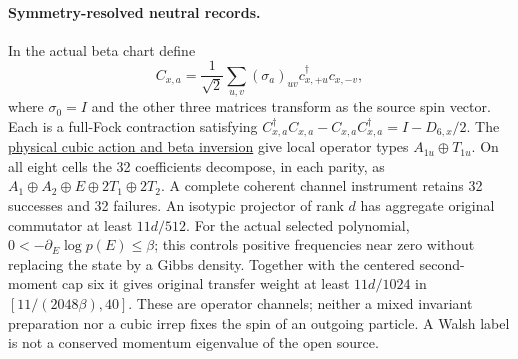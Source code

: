 \paragraph{Symmetry-resolved neutral records.}
In the actual beta chart define
\[
 C_{x,a}=\frac1{\sqrt2}\sum_{u,v}(\sigma_a)_{uv}
                         c^\dagger_{x,+u}c_{x,-v},
\]
where $\sigma_0=I$ and the other three matrices transform as the source
spin vector. Each is a full-Fock contraction satisfying
$C_{x,a}^\dagger C_{x,a}-C_{x,a}C_{x,a}^\dagger=I-D_{6,x}/2$.
The \href{https://github.com/FloatingPragma/observer-patch-holography/blob/main/model/particle_primary_pair_channels/PROOF.md}{physical cubic action and beta inversion}
give local operator types $A_{1u}\oplus T_{1u}$. On all eight cells the
32 coefficients decompose, in each parity, as
$A_1\oplus A_2\oplus E\oplus2T_1\oplus2T_2$.
A complete coherent channel instrument retains 32 successes and 32
failures. An isotypic projector of rank $d$ has aggregate original
commutator at least $11d/512$. For the actual selected polynomial,
$0<-\partial_E\log p(E)\le\beta$; this controls positive frequencies
near zero without replacing the state by a Gibbs density. Together with
the centered second-moment cap six it gives original transfer weight
at least $11d/1024$ in $[11/(2048\beta),40]$. These are operator
channels; neither a mixed invariant preparation nor a cubic irrep fixes
the spin of an outgoing particle. A Walsh label is not a conserved
momentum eigenvalue of the open source.

